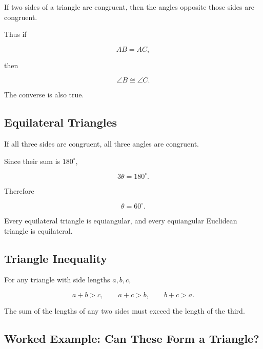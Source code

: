 \begin{theorem}
If two sides of a triangle are congruent, then the angles opposite those
sides are congruent.
\end{theorem}

Thus if

\[ AB=AC, \]

then

\[ \angle B\cong\angle C. \]

The converse is also true.

\subsection{Equilateral Triangles}
\label{subsec:equilateral-triangles}

If all three sides are congruent, all three angles are congruent.

Since their sum is \(180^\circ\),

\[ 3\theta=180^\circ. \]

Therefore

\[ \boxed{\theta=60^\circ.} \]

Every equilateral triangle is equiangular, and every equiangular Euclidean
triangle is equilateral.

\subsection{Triangle Inequality}
\label{subsec:triangle-inequality-geometry}

\begin{theorem}
For any triangle with side lengths \(a,b,c\),

\[ \boxed{a+b>c,\qquad a+c>b,\qquad b+c>a.} \]
\end{theorem}

The sum of the lengths of any two sides must exceed the length of the third.

\subsection{Worked Example: Can These Form a Triangle?}
\label{subsec:worked-triangle-inequality}

